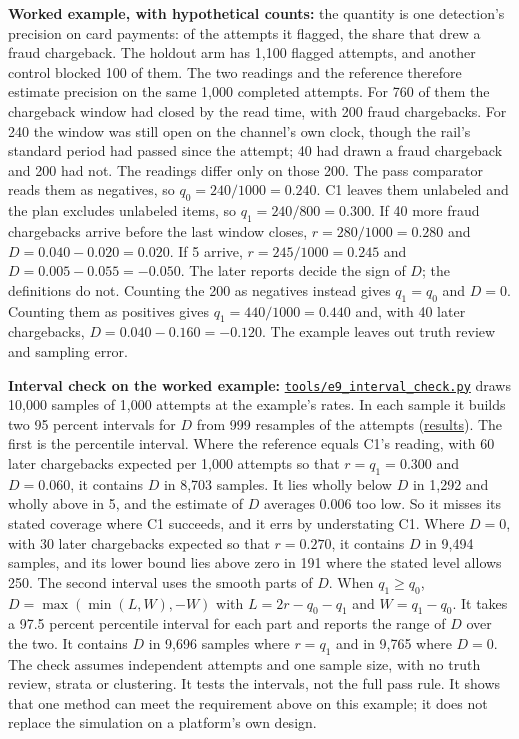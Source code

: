 \documentclass[
  11pt,
]{article}
\begin{document}
\textbf{Worked example, with hypothetical counts:} the quantity is one
detection's precision on card payments: of the attempts it flagged, the
share that drew a fraud chargeback. The holdout arm has 1,100 flagged
attempts, and another control blocked 100 of them. The two readings and
the reference therefore estimate precision on the same 1,000 completed
attempts. For 760 of them the chargeback window had closed by the read
time, with 200 fraud chargebacks. For 240 the window was still open on
the channel's own clock, though the rail's standard period had passed
since the attempt; 40 had drawn a fraud chargeback and 200 had not. The
readings differ only on those 200. The pass comparator reads them as
negatives, so \(q_0=240/1000=0.240\). C1 leaves them unlabeled and the
plan excludes unlabeled items, so \(q_1=240/800=0.300\). If 40 more
fraud chargebacks arrive before the last window closes,
\(r=280/1000=0.280\) and \(D=0.040-0.020=0.020\). If 5 arrive,
\(r=245/1000=0.245\) and \(D=0.005-0.055=-0.050\). The later reports
decide the sign of \(D\); the definitions do not. Counting the 200 as
negatives instead gives \(q_1=q_0\) and \(D=0\). Counting them as
positives gives \(q_1=440/1000=0.440\) and, with 40 later chargebacks,
\(D=0.040-0.160=-0.120\). The example leaves out truth review and
sampling error.

\textbf{Interval check on the worked example:}
\href{tools/e9_interval_check.py}{\texttt{tools/e9\_interval\_check.py}}
draws 10,000 samples of 1,000 attempts at the example's rates. In each
sample it builds two 95 percent intervals for \(D\) from 999 resamples
of the attempts (\href{SUPPLEMENT/S7_E9_INTERVAL_CHECK.json}{results}).
The first is the percentile interval. Where the reference equals C1's
reading, with 60 later chargebacks expected per 1,000 attempts so that
\(r=q_1=0.300\) and \(D=0.060\), it contains \(D\) in 8,703 samples. It
lies wholly below \(D\) in 1,292 and wholly above in 5, and the estimate
of \(D\) averages 0.006 too low. So it misses its stated coverage where
C1 succeeds, and it errs by understating C1. Where \(D=0\), with 30
later chargebacks expected so that \(r=0.270\), it contains \(D\) in
9,494 samples, and its lower bound lies above zero in 191 where the
stated level allows 250. The second interval uses the smooth parts of
\(D\). When \(q_1\ge q_0\), \(D=\max(\min(L,W),-W)\) with
\(L=2r-q_0-q_1\) and \(W=q_1-q_0\). It takes a 97.5 percent percentile
interval for each part and reports the range of \(D\) over the two. It
contains \(D\) in 9,696 samples where \(r=q_1\) and in 9,765 where
\(D=0\). The check assumes independent attempts and one sample size,
with no truth review, strata or clustering. It tests the intervals, not
the full pass rule. It shows that one method can meet the requirement
above on this example; it does not replace the simulation on a
platform's own design.
\end{document}
